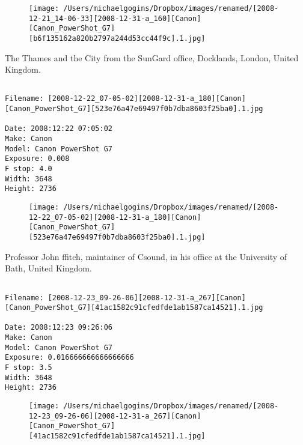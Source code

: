 \begin{figure}
\texttt{[image: /Users/michaelgogins/Dropbox/images/renamed/[2008-12-21\_14-06-33][2008-12-31-a\_160][Canon][Canon\_PowerShot\_G7][b6f135162a820b2797a244d53cc44f9c].1.jpg]}
\end{figure}
    
\clearpage
\onecolumn
\noindent The Thames and the City from the SunGard office, Docklands, London, United Kingdom.
\noindent
\begin{lstlisting}

Filename: [2008-12-22_07-05-02][2008-12-31-a_180][Canon][Canon_PowerShot_G7][523e76a47e69497f0b7dba8603f25ba0].1.jpg

Date: 2008:12:22 07:05:02
Make: Canon
Model: Canon PowerShot G7
Exposure: 0.008
F stop: 4.0
Width: 3648
Height: 2736
\end{lstlisting}
\clearpage

\begin{figure}
\texttt{[image: /Users/michaelgogins/Dropbox/images/renamed/[2008-12-22\_07-05-02][2008-12-31-a\_180][Canon][Canon\_PowerShot\_G7][523e76a47e69497f0b7dba8603f25ba0].1.jpg]}
\end{figure}
    
\clearpage
\onecolumn
\noindent Professor John ffitch, maintainer of Csound, in his office at the University of Bath, United Kingdom.
\noindent
\begin{lstlisting}

Filename: [2008-12-23_09-26-06][2008-12-31-a_267][Canon][Canon_PowerShot_G7][41ac1582c91cfedfde1ab1587ca14521].1.jpg

Date: 2008:12:23 09:26:06
Make: Canon
Model: Canon PowerShot G7
Exposure: 0.016666666666666666
F stop: 3.5
Width: 3648
Height: 2736
\end{lstlisting}
\clearpage

\begin{figure}
\texttt{[image: /Users/michaelgogins/Dropbox/images/renamed/[2008-12-23\_09-26-06][2008-12-31-a\_267][Canon][Canon\_PowerShot\_G7][41ac1582c91cfedfde1ab1587ca14521].1.jpg]}
\end{figure}
    
